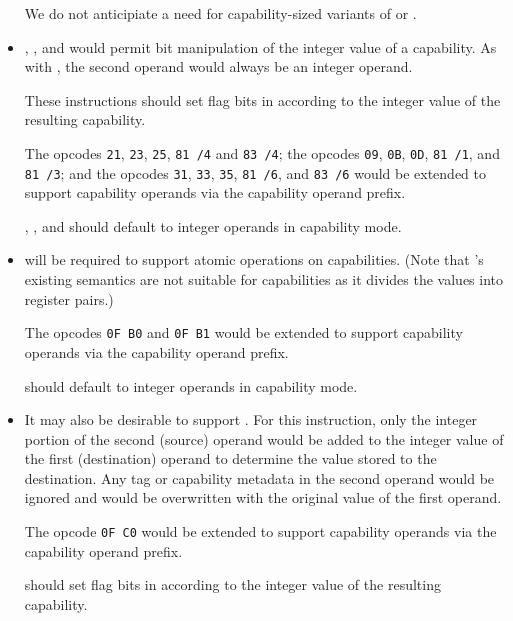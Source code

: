 \begin{itemize}
    We do not anticipiate a need for capability-sized variants of
     or .

  \item {}, , and  would
    permit bit manipulation of the integer value of a capability.  As
    with , the second operand would always be an
    integer operand.

    These instructions should set flag bits in \RFLAGS{} according to
    the integer value of the resulting capability.

    The  opcodes \texttt{21}, \texttt{23}, \texttt{25},
    \texttt{81 /4} and \texttt{83 /4}; the  opcodes
    \texttt{09}, \texttt{0B}, \texttt{0D}, \texttt{81 /1}, and
    \texttt{81 /3}; and the  opcodes \texttt{31},
    \texttt{33}, \texttt{35}, \texttt{81 /6}, and \texttt{83 /6} would
    be extended to support capability operands via the capability
    operand prefix.

    , , and  should
    default to integer operands in capability mode.

  \item {} will be required to support atomic
    operations on capabilities.  (Note that 's
    existing semantics are not suitable for capabilities as it divides
    the values into register pairs.)

    The opcodes \texttt{0F B0} and \texttt{0F B1} would be extended to
    support capability operands via the capability operand prefix.

     should default to integer operands in
    capability mode.

  \item It may also be desirable to support .  For
    this instruction, only the integer portion of the second (source)
    operand would be added to the integer value of the first
    (destination) operand to determine the value stored to the
    destination.  Any tag or capability metadata in the second operand
    would be ignored and would be overwritten with the original value
    of the first operand.

    The opcode \texttt{0F C0} would be extended to support capability
    operands via the capability operand prefix.

     should set flag bits in \RFLAGS{} according to
    the integer value of the resulting capability.


\end{itemize}
